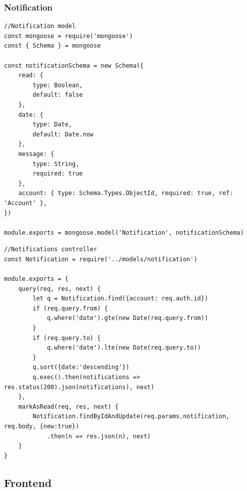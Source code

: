 \documentclass{report}
\begin{document}
\subsubsection{Notification}
\begin{lstlisting}
//Notification model
const mongoose = require('mongoose')
const { Schema } = mongoose

const notificationSchema = new Schema({
    read: {
        type: Boolean,
        default: false
    },
    date: {
        type: Date,
        default: Date.now
    },
    message: {
        type: String,
        required: true
    },
    account: { type: Schema.Types.ObjectId, required: true, ref: 'Account' },
})

module.exports = mongoose.model('Notification', notificationSchema)
\end{lstlisting}

\begin{lstlisting}
//Notifications controller
const Notification = require('../models/notification')

module.exports = {
    query(req, res, next) {
        let q = Notification.find({account: req.auth.id})
        if (req.query.from) {
            q.where('date').gte(new Date(req.query.from))
        }
        if (req.query.to) {
            q.where('date').lte(new Date(req.query.to))
        }
        q.sort({date:'descending'})
        q.exec().then(notifications => res.status(200).json(notifications), next)
    },
    markAsRead(req, res, next) {
        Notification.findByIdAndUpdate(req.params.notification, req.body, {new:true})
            .then(n => res.json(n), next)
    }
}
\end{lstlisting}

\subsection{Frontend}
\end{document}
